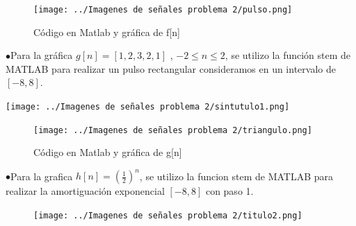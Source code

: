 \documentclass[11pt,a4paper]{article}
\begin{document}
{{\begin{enumerate}
\begin{figure}[h]
\centering
\texttt{[image: ../Imagenes de señales problema 2/pulso.png]} 
\caption{Código en Matlab y gráfica de f[n]} 
\label{Gráfica_fn}
\end{figure}
$\bullet$Para la gráfica $g[n]=[1,2,3,2,1]$ , $-2\leq n\leq 2$, se utilizo la función stem de MATLAB para realizar un pulso rectangular consideramos en un intervalo de $[-8,8]$.

\begin{center}
\texttt{[image: ../Imagenes de señales problema 2/sintutulo1.png]}
\end{center}

\begin{figure}[h]
\centering
\texttt{[image: ../Imagenes de señales problema 2/triangulo.png]} 
\caption{Código en Matlab y gráfica de g[n]} 
\label{Gráfica_gn}
\end{figure}
\newpage
$\bullet$Para la grafica $h[n]=(\frac{1}{2})^n$, se utilizo la funcion stem de MATLAB para realizar la amortiguación exponencial $[-8,8]$ con paso 1.
\begin{figure}[h]
\centering
\texttt{[image: ../Imagenes de señales problema 2/titulo2.png]} 
\label{Código_hn}
\end{figure}


\end{enumerate}}}
\end{document}
